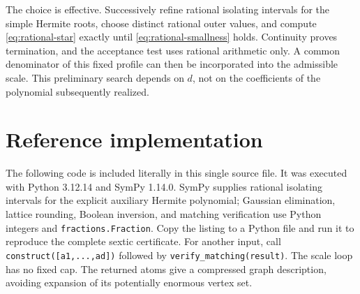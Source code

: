 \documentclass[11pt,a4paper]{article}
\theoremstyle{definition}
\begin{document}
The choice is effective. Successively refine rational isolating intervals
for the simple Hermite roots, choose distinct rational outer values, and
compute \eqref{eq:rational-star} exactly until
\eqref{eq:rational-smallness} holds. Continuity proves termination, and
the acceptance test uses rational arithmetic only. A common denominator
of this fixed profile can then be incorporated into the admissible scale.
This preliminary search depends on $d$, not on the coefficients of the
polynomial subsequently realized.


\section{Reference implementation}\label{app:code}

The following code is included literally in this single source file.
It was executed with Python 3.12.14 and SymPy 1.14.0. SymPy supplies
rational isolating intervals for the explicit auxiliary Hermite
polynomial; Gaussian elimination, lattice rounding, Boolean inversion,
and matching verification use Python integers and
\texttt{fractions.Fraction}. Copy the listing to a Python file and run
it to reproduce the complete sextic certificate. For another input,
call \texttt{construct([a1,...,ad])} followed by
\texttt{verify\_matching(result)}. The scale loop has no fixed cap.
The returned atoms give a compressed graph description, avoiding
expansion of its potentially enormous vertex set.
\end{document}
